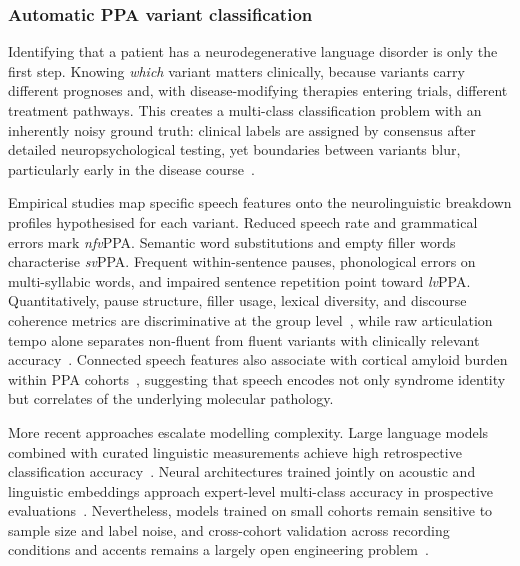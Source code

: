 \subsubsection{Automatic PPA variant classification}
\label{ssec:ppa_classification}

Identifying that a patient has a neurodegenerative language disorder is only the first step.
Knowing \emph{which} variant matters clinically, because variants carry different prognoses and, with disease-modifying therapies entering trials, different treatment pathways.
This creates a multi-class classification problem with an inherently noisy ground truth: clinical labels are assigned by consensus after detailed neuropsychological testing, yet boundaries between variants blur, particularly early in the disease course~\cite{macoir2025rethinkingppa}.

Empirical studies map specific speech features onto the neurolinguistic breakdown profiles hypothesised for each variant.
Reduced speech rate and grammatical errors mark \textit{nfv}PPA.
Semantic word substitutions and empty filler words characterise \textit{sv}PPA.
Frequent within-sentence pauses, phonological errors on multi-syllabic words, and impaired sentence repetition point toward \textit{lv}PPA.
Quantitatively, pause structure, filler usage, lexical diversity, and discourse coherence metrics are discriminative at the group level~\cite{cho2022lexical}, while raw articulation tempo alone separates non-fluent from fluent variants with clinically relevant accuracy~\cite{cordella2017articulation,haley2021speechmetrics}.
Connected speech features also associate with cortical amyloid burden within PPA cohorts~\cite{slegers2021connectedppa}, suggesting that speech encodes not only syndrome identity but correlates of the underlying molecular pathology.

More recent approaches escalate modelling complexity.
Large language models combined with curated linguistic measurements achieve high retrospective classification accuracy~\cite{rezaii2024ppallm}.
Neural architectures trained jointly on acoustic and linguistic embeddings approach expert-level multi-class accuracy in prospective evaluations~\cite{themistocleous2021automatic}.
Nevertheless, models trained on small cohorts remain sensitive to sample size and label noise, and cross-cohort validation across recording conditions and accents remains a largely open engineering problem~\cite{nevler2019validated}.

